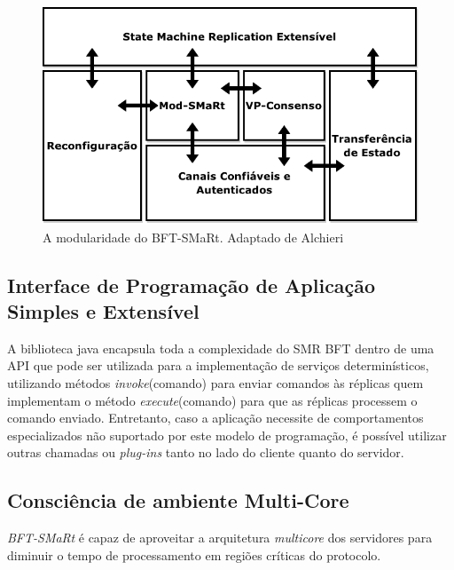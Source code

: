 		\begin{figure}[htb]
			\begin{center}
				
				\includegraphics[clip,width=13.0cm]{images/image4.png}
				\caption{A modularidade do BFT-SMaRt. Adaptado de Alchieri~\cite{bessani3}}
				\label{fig:vis_sis}
			\end{center}
		\end{figure}
		
		\subsection{Interface de Programação de Aplicação Simples e Extensível}
		A biblioteca java encapsula toda a complexidade do SMR BFT dentro de uma API que pode ser utilizada para a implementação de serviços determinísticos, utilizando métodos \textit{invoke}(comando) para enviar comandos às réplicas quem implementam o método \textit{execute}(comando) para que as réplicas processem o comando enviado. Entretanto, caso a aplicação necessite de comportamentos especializados não suportado por este modelo de programação, é possível utilizar outras chamadas ou \textit{plug-ins} tanto no lado do cliente quanto do servidor.\\
		
		
		\subsection{Consciência de ambiente Multi-Core}
		\textit{BFT-SMaRt} é capaz de aproveitar a arquitetura \textit{multicore} dos servidores para diminuir o tempo de processamento em regiões críticas do protocolo.\\
		
